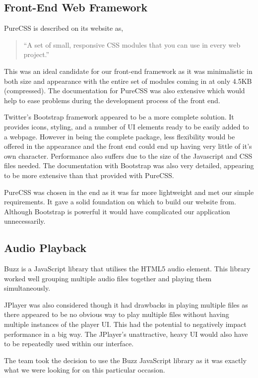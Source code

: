 \documentclass{l3proj}
\begin{document}
\subsection{Front-End Web Framework}
PureCSS is described on its website as,

\blockquote{“A set of small, responsive CSS modules that you can use in every web project.”}

This was an ideal candidate for our front-end framework as it was minimalistic in both size and appearance with the entire set of modules coming in at only 4.5KB (compressed). The documentation for PureCSS was also extensive which would help to ease problems during the development process of the front end.

Twitter's Bootstrap framework appeared to be a more complete solution. It provides icons, styling, and a number of UI elements ready to be easily added to a webpage. However in being the complete package, less flexibility would be offered in the appearance and the front end could end up having very little of it's own character. Performance also suffers due to the size of the Javascript and CSS files needed. The documentation with Bootstrap was also very detailed, appearing to be more extensive than that provided with PureCSS.

PureCSS was chosen in the end as it was far more lightweight and met our simple requirements. It gave a solid foundation on which to build our website from. Although Bootstrap is powerful it would have complicated our application unnecessarily.


\subsection{Audio Playback}
Buzz is a JavaScript library that utilises the HTML5 audio element. This library worked well grouping multiple audio files together and playing them simultaneously.

JPlayer was also considered though it had drawbacks in playing multiple files as there appeared to be no obvious way to play multiple files without having multiple instances of the player UI. This had the potential to negatively impact performance in a big way. The JPlayer's unattractive, heavy UI would also have to be repeatedly used within our interface.

The team took the decision to use the Buzz JavaScript library as it was exactly what we were looking for on this particular occasion.

\end{document}
